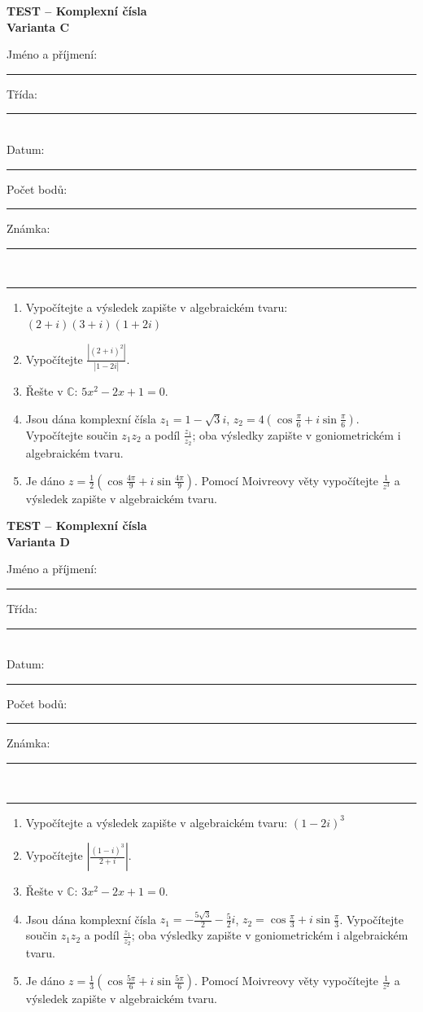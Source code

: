 \documentclass[a4paper,11pt]{article}
\newcommand{\TestTitle}{Komplexní čísla}
\newcommand{\TestHeader}[1]{%
    \begin{center}
        {\Large\bfseries TEST -- \TestTitle}\\[2mm]
        {\bfseries Varianta #1}
    \end{center}
    \vspace{2mm}
    Jméno a příjmení: \rule{9cm}{0.4pt}\hfill Třída: \rule{2cm}{0.4pt}\\[3mm]
    Datum: \rule{3cm}{0.4pt}\hfill Počet bodů: \rule{2cm}{0.4pt}\hfill Známka: \rule{2cm}{0.4pt}\\[2mm]
    \hrule\vspace{4mm}
}
\newcommand{\AnswerSpace}[1]{\vspace{#1}}
\begin{document}
\TestHeader{C}

\begin{enumerate}
    \item Vypočítejte a výsledek zapište v algebraickém tvaru: $(2+i)(3+i)(1+2i)$
    \AnswerSpace{16mm}
    \item Vypočítejte $\displaystyle \frac{|(2+i)^2|}{|1-2i|}$.
    \AnswerSpace{22mm}
    \item Řešte v $\mathbb{C}$: $5x^2-2x+1=0$.
    \AnswerSpace{25mm}
    \item Jsou dána komplexní čísla $\displaystyle z_1=1-\sqrt3i$,
        $\displaystyle z_2=4\left(\cos\frac{\pi}{6}+i\sin\frac{\pi}{6}\right)$.
    Vypočítejte součin $z_1z_2$ a podíl $\frac{z_1}{z_2}$; oba výsledky zapište v goniometrickém i algebraickém tvaru.
    \AnswerSpace{37mm}
    \item Je dáno $\displaystyle
            z=\frac12\left(
                \cos\frac{4\pi}{9}
                +i\sin\frac{4\pi}{9}
            \right)$.
    Pomocí Moivreovy věty vypočítejte $\frac1{z^3}$ a výsledek zapište v algebraickém tvaru.
    \AnswerSpace{29mm}
\end{enumerate}

\newpage
\TestHeader{D}

\begin{enumerate}
    \item Vypočítejte a výsledek zapište v algebraickém tvaru: $(1-2i)^3$
    \AnswerSpace{16mm}
    \item Vypočítejte $\displaystyle \left|\frac{(1-i)^3}{2+i}\right|$.
    \AnswerSpace{22mm}
    \item Řešte v $\mathbb{C}$: $3x^2-2x+1=0$.
    \AnswerSpace{25mm}
    \item Jsou dána komplexní čísla $\displaystyle z_1=-\frac{5\sqrt3}{2}-\frac52i$,
        $\displaystyle z_2=\cos\frac{\pi}{3}+i\sin\frac{\pi}{3}$.
    Vypočítejte součin $z_1z_2$ a podíl $\frac{z_1}{z_2}$; oba výsledky zapište v goniometrickém i algebraickém tvaru.
    \AnswerSpace{37mm}
    \item Je dáno $\displaystyle
            z=\frac13\left(
                \cos\frac{5\pi}{6}
                +i\sin\frac{5\pi}{6}
            \right)$.
    Pomocí Moivreovy věty vypočítejte $\frac1{z^2}$ a výsledek zapište v algebraickém tvaru.
    \AnswerSpace{29mm}
\end{enumerate}
\end{document}

